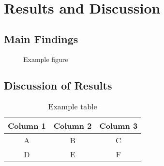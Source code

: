 \chapter{Results and Discussion}
\section{Main Findings}
\lipsum[12]
\begin{figure}[htb]
  \centering
  \caption{Example figure}
  \label{fig:example}
\end{figure}

\section{Discussion of Results}
\lipsum[13]
\begin{table}[htb]
  \centering
  \caption{Example table}
  \begin{tabular}{ccc}
    \hline
    Column 1 & Column 2 & Column 3 \\
    \hline
    A & B & C \\
    D & E & F \\
    \hline
  \end{tabular}
  \label{tab:example}
\end{table}
